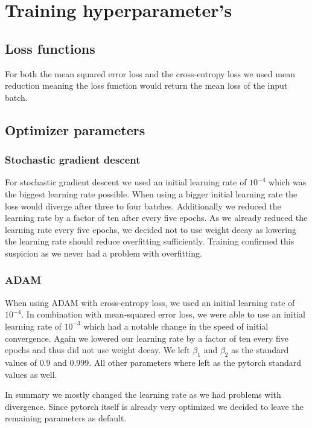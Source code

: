 \vspace{3 em}
\section{Training hyperparameter's}
\subsection{Loss functions}

For both the mean squared error loss and the cross-entropy loss we used mean reduction meaning the loss function would return the mean loss of the input batch.

\subsection{Optimizer parameters}
\subsubsection{Stochastic gradient descent}
For stochastic gradient descent we used an initial learning rate of $10^{-4}$ which was the biggest learning rate possible. 
When using a bigger initial learning rate the loss would diverge after three to four batches. Additionally we reduced the learning rate by a factor of ten after every five epochs.
As we already reduced the learning rate every five epochs, we decided not to use weight decay as lowering the learning rate should reduce overfitting sufficiently.
Training confirmed this suspicion as we never had a problem with overfitting.

\subsubsection{ADAM}
When using ADAM with cross-entropy loss, we used an initial learning rate of $10^{-4}$. In combination with mean-squared error loss, we were able to use an initial learning rate of $10^{-3}$ which had a notable change in the speed of initial convergence.
Again we lowered our learning rate by a factor of ten every five epochs and thus did not use weight decay. We left $\beta_1$ and $\beta_2$ as the standard values of $0.9$ and $0.999$. All other parameters where left as the pytorch standard values as well.


In summary we mostly changed the learning rate as we had problems with divergence. Since pytorch itself is already very optimized we decided to leave the remaining parameters as default.

